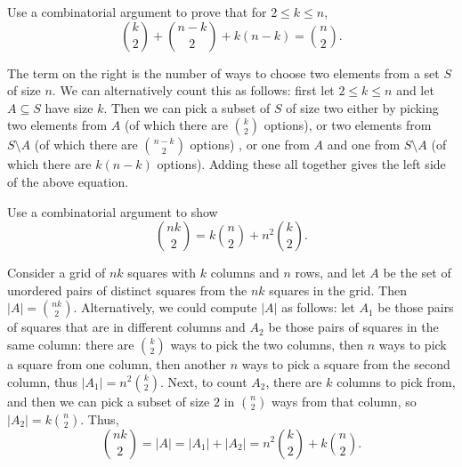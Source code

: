 \documentclass[11pt,dvipsnames]{book}
\numberwithin{figure}{section} %
\numberwithin{table}{section} %
\begin{document}
\begin{exercise} Use a combinatorial argument to prove that  for $2\leq k\leq n$,
\[
{k \choose 2} + {n-k \choose 2}+k(n-k) = {n \choose 2}.\]
\begin{solution}
The term on the right is the number of ways to choose two elements from a set $S$ of size $n$. We can alternatively count this as follows: first let $2\leq k\leq n$ and let $A\subseteq S$ have size $k$. Then we can pick a subset of $S$ of size two either by picking two elements from $A$ (of which there are ${k \choose 2}  $ options), or two elements from $S\setminus A$ (of which there  are ${n-k \choose 2}$ options) , or one from $A$ and one from $S\setminus A$ (of which there are $k(n-k)$ options). Adding these all together gives the left side of the above equation.
\end{solution}
\end{exercise}

\begin{exercise}
 Use a combinatorial argument to show
\[
\binom{nk}{2} = k \binom{n}{2} + n^2 \binom{k}{2}.
\]

\begin{solution}

Consider a grid of $nk$ squares with $k$ columns and $n$ rows, and let $A$ be the set of unordered pairs of distinct squares from the $nk$ squares in the grid. Then $|A|=\binom{nk}{2}$. Alternatively, we could compute $|A|$ as follows: let $A_{1}$ be those pairs of squares that are in different columns and $A_{2}$ be those pairs of squares in the same column: there are $ \binom{k}{2}$ ways to pick the two columns, then $n$ ways to pick a square from one column, then another $n$ ways to pick a square from the second column, thus $|A_{1}|=n^2 \binom{k}{2}$. Next, to count $A_{2}$, there are $k$ columns to pick from, and then we can pick a subset of size $2$ in $ \binom{n}{2}$ ways from that column, so $|A_{2}|=k \binom{n}{2} $. Thus,
\[
\binom{nk}{2} = |A|=|A_{1}|+|A_{2}|= n^2 \binom{k}{2}+k \binom{n}{2} .
\]

\end{solution}

\end{exercise}
\end{document}
